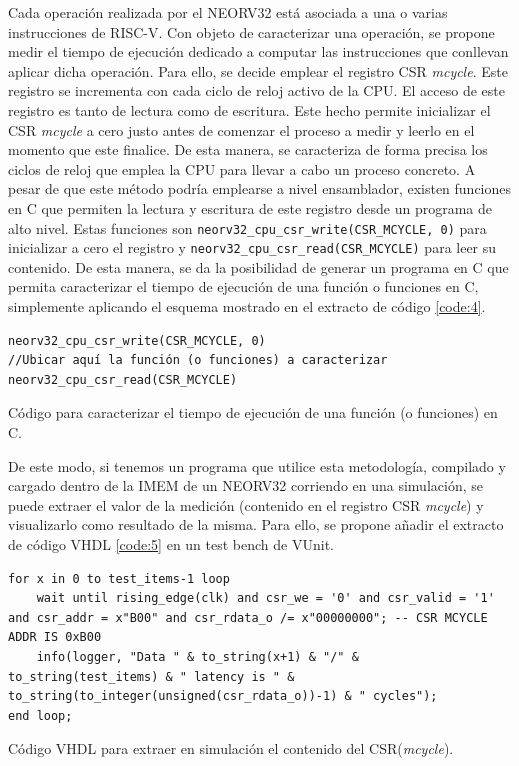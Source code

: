 Cada operación realizada por el NEORV32 está asociada a una o varias instrucciones de RISC-V.
Con objeto de caracterizar una operación, se propone medir el tiempo de ejecución dedicado a computar las instrucciones que conllevan aplicar dicha operación.
Para ello, se decide emplear el registro CSR \textit{mcycle}.
Este registro se incrementa con cada ciclo de reloj activo de la CPU.
El acceso de este registro es tanto de lectura como de escritura.
Este hecho permite inicializar el CSR \textit{mcycle} a cero justo antes de comenzar el proceso a medir y leerlo en el momento que este finalice.
De esta manera, se caracteriza de forma precisa los ciclos de reloj que emplea la CPU para llevar a cabo un proceso concreto.
A pesar de que este método podría emplearse a nivel ensamblador, existen funciones en C que permiten la lectura y escritura de este registro desde un programa de alto nivel.
Estas funciones son \texttt{neorv32_cpu_csr_write(CSR_MCYCLE, 0)} para inicializar a cero el registro y \texttt{neorv32_cpu_csr_read(CSR_MCYCLE)} para leer su contenido.
De esta manera, se da la posibilidad de generar un programa en C que permita caracterizar el tiempo de ejecución de una función o funciones en C, simplemente aplicando el esquema mostrado en el extracto de código \ref{code:4}.

\begin{code}
\begin{verbatim}
neorv32_cpu_csr_write(CSR_MCYCLE, 0)
//Ubicar aquí la función (o funciones) a caracterizar
neorv32_cpu_csr_read(CSR_MCYCLE)
\end{verbatim}
\caption{Código para caracterizar el tiempo de ejecución de una función (o funciones) en C.}
\label{code:4}
\end{code}

De este modo, si tenemos un programa que utilice esta metodología, compilado y cargado dentro de la IMEM de un NEORV32 corriendo en una simulación, se puede extraer el valor de la medición (contenido en el registro CSR \textit{mcycle}) y visualizarlo como resultado de la misma.
Para ello, se propone añadir el extracto de código VHDL \ref{code:5} en un test bench de VUnit.

\begin{code}
\begin{verbatim}
for x in 0 to test_items-1 loop
    wait until rising_edge(clk) and csr_we = '0' and csr_valid = '1' and csr_addr = x"B00" and csr_rdata_o /= x"00000000"; -- CSR MCYCLE ADDR IS 0xB00
    info(logger, "Data " & to_string(x+1) & "/" & to_string(test_items) & " latency is " & to_string(to_integer(unsigned(csr_rdata_o))-1) & " cycles");
end loop;
\end{verbatim}
\caption{Código VHDL para extraer en simulación el contenido del CSR(\textit{mcycle}).}
\label{code:5}
\end{code}


